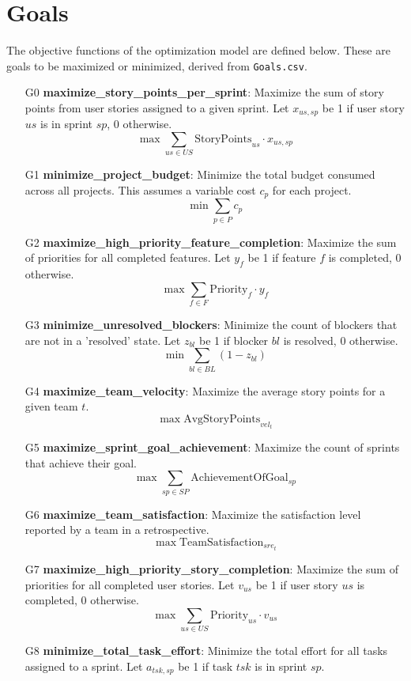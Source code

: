 \documentclass[11pt]{article}
\begin{document}
\section{Goals}
The objective functions of the optimization model are defined below. These are goals to be maximized or minimized, derived from \texttt{Goals.csv}.

\begin{itemize}
    \item[G0] \textbf{maximize\_story\_points\_per\_sprint}: Maximize the sum of story points from user stories assigned to a given sprint. Let $x_{us,sp}$ be 1 if user story $us$ is in sprint $sp$, 0 otherwise.
    $$ \max \sum_{us \in US} \text{StoryPoints}_{us} \cdot x_{us,sp} $$
    \item[G1] \textbf{minimize\_project\_budget}: Minimize the total budget consumed across all projects. This assumes a variable cost $c_p$ for each project.
    $$ \min \sum_{p \in P} c_p $$
    \item[G2] \textbf{maximize\_high\_priority\_feature\_completion}: Maximize the sum of priorities for all completed features. Let $y_f$ be 1 if feature $f$ is completed, 0 otherwise.
    $$ \max \sum_{f \in F} \text{Priority}_{f} \cdot y_f $$
    \item[G3] \textbf{minimize\_unresolved\_blockers}: Minimize the count of blockers that are not in a 'resolved' state. Let $z_{bl}$ be 1 if blocker $bl$ is resolved, 0 otherwise.
    $$ \min \sum_{bl \in BL} (1 - z_{bl}) $$
    \item[G4] \textbf{maximize\_team\_velocity}: Maximize the average story points for a given team $t$.
    $$ \max \text{AvgStoryPoints}_{vel_t} $$
    \item[G5] \textbf{maximize\_sprint\_goal\_achievement}: Maximize the count of sprints that achieve their goal.
    $$ \max \sum_{sp \in SP} \text{AchievementOfGoal}_{sp} $$
    \item[G6] \textbf{maximize\_team\_satisfaction}: Maximize the satisfaction level reported by a team in a retrospective.
    $$ \max \text{TeamSatisfaction}_{sre_t} $$
    \item[G7] \textbf{maximize\_high\_priority\_story\_completion}: Maximize the sum of priorities for all completed user stories. Let $v_{us}$ be 1 if user story $us$ is completed, 0 otherwise.
    $$ \max \sum_{us \in US} \text{Priority}_{us} \cdot v_{us} $$
    \item[G8] \textbf{minimize\_total\_task\_effort}: Minimize the total effort for all tasks assigned to a sprint. Let $a_{tsk,sp}$ be 1 if task $tsk$ is in sprint $sp$.

\end{itemize}
\end{document}

